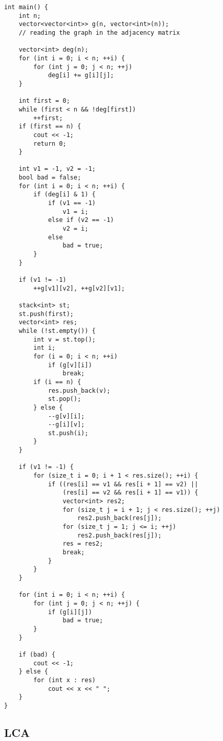 \documentclass{article}
\begin{document}
\begin{lstlisting}
int main() {
    int n;
    vector<vector<int>> g(n, vector<int>(n));
    // reading the graph in the adjacency matrix

    vector<int> deg(n);
    for (int i = 0; i < n; ++i) {
        for (int j = 0; j < n; ++j)
            deg[i] += g[i][j];
    }

    int first = 0;
    while (first < n && !deg[first])
        ++first;
    if (first == n) {
        cout << -1;
        return 0;
    }

    int v1 = -1, v2 = -1;
    bool bad = false;
    for (int i = 0; i < n; ++i) {
        if (deg[i] & 1) {
            if (v1 == -1)
                v1 = i;
            else if (v2 == -1)
                v2 = i;
            else
                bad = true;
        }
    }

    if (v1 != -1)
        ++g[v1][v2], ++g[v2][v1];

    stack<int> st;
    st.push(first);
    vector<int> res;
    while (!st.empty()) {
        int v = st.top();
        int i;
        for (i = 0; i < n; ++i)
            if (g[v][i])
                break;
        if (i == n) {
            res.push_back(v);
            st.pop();
        } else {
            --g[v][i];
            --g[i][v];
            st.push(i);
        }
    }

    if (v1 != -1) {
        for (size_t i = 0; i + 1 < res.size(); ++i) {
            if ((res[i] == v1 && res[i + 1] == v2) ||
                (res[i] == v2 && res[i + 1] == v1)) {
                vector<int> res2;
                for (size_t j = i + 1; j < res.size(); ++j)
                    res2.push_back(res[j]);
                for (size_t j = 1; j <= i; ++j)
                    res2.push_back(res[j]);
                res = res2;
                break;
            }
        }
    }

    for (int i = 0; i < n; ++i) {
        for (int j = 0; j < n; ++j) {
            if (g[i][j])
                bad = true;
        }
    }

    if (bad) {
        cout << -1;
    } else {
        for (int x : res)
            cout << x << " ";
    }
}
\end{lstlisting}

\subsection{LCA}
\end{document}
